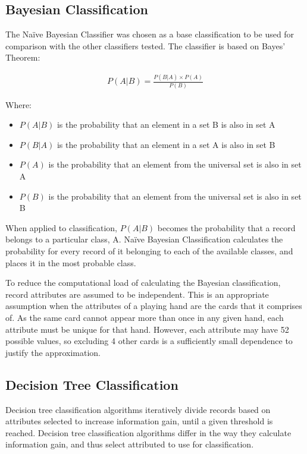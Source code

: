 \documentclass[11pt, a4paper]{article}
\begin{document}
\subsection*{Bayesian Classification}

The Na\"ive Bayesian Classifier was chosen as a base classification to be used for comparison with the other classifiers tested. The classifier is based on Bayes' Theorem:

\begin{align*}
	P(A|B) = \frac{P(B|A) \times P(A)}{P(B)}
\end{align*}

Where:

\begin{itemize}
	\item $P(A|B)$ is the probability that an element in a set B is also in set A
	\item $P(B|A)$ is the probability that an element in a set A is also in set B
	\item $P(A)$ is the probability that an element from the universal set is also in set A
	\item $P(B)$ is the probability that an element from the universal set is also in set B
\end{itemize}

When applied to classification, $P(A|B)$ becomes the probability that a record belongs to a particular class, A. Na\"ive Bayesian Classification calculates the probability for every record of it belonging to each of the available classes, and places it in the most probable class.	

To reduce the computational load of calculating the Bayesian classification, record attributes are assumed to be independent. This is an appropriate assumption when the attributes of a playing hand are the cards that it comprises of. As the same card cannot appear more than once in any given hand, each attribute must be unique for that hand. However, each attribute may have 52 possible values, so excluding 4 other cards is a sufficiently small dependence to justify the approximation.

\subsection*{Decision Tree Classification}

Decision tree classification algorithms iteratively divide records based on attributes selected to increase information gain, until a given threshold is reached. Decision tree classification algorithms differ in the way they calculate information gain, and thus select attributed to use for classification.
\end{document}
